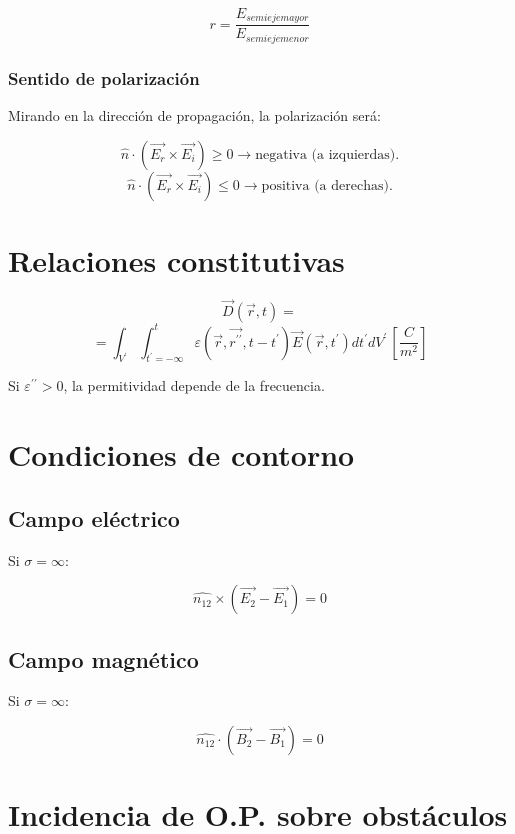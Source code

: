 \documentclass[12pt,a4paper]{article}
\begin{document}
\[ r = \frac{E_{semieje mayor}}{E_{semieje menor}} \] 

\subsubsection{Sentido de polarización}
\label{ssub:sentido_de_polarizacion}

Mirando en la dirección de propagación, la polarización será:

\[ \hat{n} \cdot \left( \vec{E_r} \times \vec{E_i} \right) \geq 0
\rightarrow \mbox{negativa (a izquierdas)}. \]
\[ \hat{n} \cdot \left( \vec{E_r} \times \vec{E_i} \right) \leq 0
\rightarrow \mbox{positiva (a derechas)}. \]

\section{Relaciones constitutivas}
\label{sec:relaciones_constitutivas}

\[ \vec{D} (\vec{r}, t) = \]
\[ = \int_{V^{\prime}} \int_{t^{\prime}=-\infty}^{t}
\varepsilon (\vec{r}, \vec{r^{\prime\prime}}, t-t^{\prime})
\vec{E} (\vec{r}, t^{\prime}) dt^{\prime} dV^{\prime}
\, \left[\frac{C}{m^2} \right] \]

Si $ \varepsilon^{\prime\prime} > 0 $, la permitividad depende de la
frecuencia.

\section{Condiciones de contorno}
\label{sec:condiciones_de_contorno}

\subsection{Campo eléctrico}
\label{sub:campo_electrico}

Si $ \sigma = \infty $:

\[ \hat{n_{12}} \times ( \vec{E_2} - \vec{E_1} ) = 0 \]

\subsection{Campo magnético}
\label{sub:campo_magnetico}

Si $ \sigma = \infty $:

\[ \hat{n_{12}} \cdot ( \vec{B_2} - \vec{B_1} ) = 0 \]

\section{Incidencia de O.P. sobre obstáculos}
\label{sec:incidencia_de_o_p_sobre_obstaculos}
\end{document}
